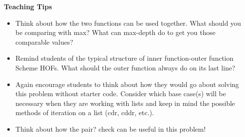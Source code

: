 \begin{blocksection}
\begin{guide}
\textbf{Teaching Tips}
\begin{itemize}
	\item Think about how the two functions can be used together. What should you be comparing with max? What can max-depth do to get you those comparable values?
	\item Remind students of the typical structure of inner function-outer function Scheme HOFs. What should the outer function always do on its last line?
	\item Again encourage students to think about how they would go about solving this problem without starter code. Consider which base case(s) will be necessary when they are working with lists and keep in mind the possible methods of iteration on a list (cdr, cddr, etc.).
	\item Think about how the pair? check can be useful in this problem!
\end{itemize}
\end{guide}
\end{blocksection}